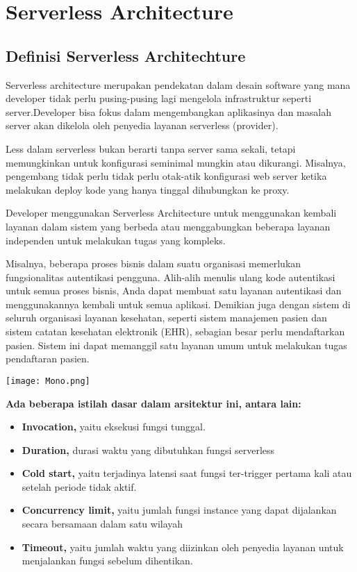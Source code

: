 
\chapter{Serverless Architecture}
\section{Definisi Serverless Architechture}
Serverless architecture merupakan pendekatan dalam desain software yang mana developer tidak perlu pusing-pusing lagi mengelola infrastruktur seperti server.Developer bisa fokus dalam mengembangkan aplikasinya dan masalah server akan dikelola oleh penyedia layanan serverless (provider).

Less dalam serverless bukan berarti tanpa server sama sekali, tetapi memungkinkan untuk konfigurasi seminimal mungkin atau dikurangi. Misalnya, pengembang tidak perlu tidak perlu otak-atik konfigurasi web server ketika melakukan deploy kode yang hanya tinggal dihubungkan ke proxy.

Developer menggunakan Serverless Architecture untuk menggunakan kembali layanan dalam sistem yang berbeda atau menggabungkan beberapa layanan independen untuk melakukan tugas yang kompleks. 

Misalnya, beberapa proses bisnis dalam suatu organisasi memerlukan fungsionalitas autentikasi pengguna. Alih-alih menulis ulang kode autentikasi untuk semua proses bisnis, Anda dapat membuat satu layanan autentikasi dan menggunakannya kembali untuk semua aplikasi. Demikian juga dengan sistem di seluruh organisasi layanan kesehatan, seperti sistem manajemen pasien dan sistem catatan kesehatan elektronik (EHR), sebagian besar perlu mendaftarkan pasien. Sistem ini dapat memanggil satu layanan umum untuk melakukan tugas pendaftaran pasien.

\texttt{[image: Mono.png]}

\textbf{Ada beberapa istilah dasar dalam arsitektur ini, antara lain:}

\begin{itemize}
	\item \textbf{Invocation,} yaitu eksekusi fungsi tunggal.
	\item \textbf{Duration,} durasi waktu yang dibutuhkan fungsi serverless
	\item \textbf{Cold start,} yaitu terjadinya latensi saat fungsi ter-trigger pertama kali atau setelah periode tidak aktif.
	\item \textbf{Concurrency limit,} yaitu jumlah fungsi instance yang dapat dijalankan secara bersamaan dalam satu wilayah
	\item \textbf{Timeout,} yaitu jumlah waktu yang diizinkan oleh penyedia layanan untuk menjalankan fungsi sebelum dihentikan.
\end{itemize}

